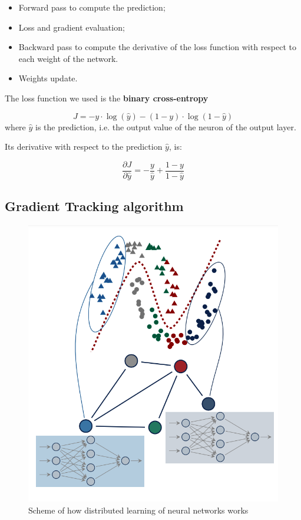 \documentclass[a4paper,11pt,oneside]{book}
\begin{document}
\begin{itemize}
    \item Forward pass to compute the prediction;
    \item Loss and gradient evaluation;
    \item Backward pass to compute the derivative of the loss function with respect to each weight of the network.
    \item Weights update.
\end{itemize}

The loss function we used is the \textbf{binary cross-entropy} 

\begin{equation}
J = - y \cdot \log(\hat{y}) - (1 - y) \cdot \log(1 - \hat{y})
\label{Cost_funct}
\end{equation}
where $\hat{y}$ is the prediction, i.e. the output value of the neuron of the output layer.

Its derivative with respect to the prediction $\hat{y}$, is:

\begin{equation}
\frac{\partial J}{\partial \hat{y}} = - \frac{y}{\hat{y}} + \frac{1 - y}{1 - \hat{y}}
\end{equation}



\subsection{Gradient Tracking algorithm}

\begin{figure}[h]
	\centering
	\includegraphics[scale=0.2]{Distributed_learning}
	\caption{Scheme of how distributed learning of neural networks works}
	\label{Distributed_learning}
\end{figure}
\end{document}

